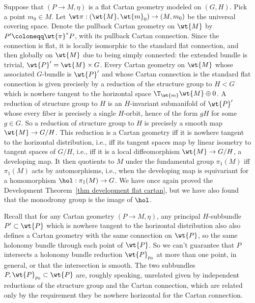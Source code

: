 \begin{example}
    Suppose that $(P\to M,\eta)$ is a flat Cartan geometry modeled on $(G,H)$. Pick a point $m_0\in M$. Let $\wt\pi:(\wt{M},\wt{m}_0)\to (M,m_0)$ be the universal covering space. Denote the pullback Cartan geometry on $\wt{M}$ by $P'\coloneqq \wt{\pi}^\ast P$, with its pullback Cartan connection. Since the connection is flat, it is locally isomorphic to the standard flat connection, and then globally on $\wt{M}$ due to being simply connected: the extended bundle is trivial, $\wt{P}'=\wt{M}\times G$. Every Cartan geometry on $\wt{M}$ whose associated $G$-bundle is $\wt{P}'$ and whose Cartan connection is the standard flat connection is given precisely by a reduction of the structure group to $H<G$ which is nowhere tangent to the horizontal space $\T_{\wt{m}}\wt{M}\oplus 0$. A reduction of structure group to $H$ is an $H$-invariant submanifold of $\wt{P}'$ whose every fiber is precisely a single $H$-orbit, hence of the form $gH$ for some $g\in G$. So a reduction of structure group to $H$ is precisely a smooth map $\wt{M}\to G\slash H$. This reduction is a Cartan geometry iff it is nowhere tangent to the horizontal distribution, i.e., iff its tangent spaces map by linear isometry to tangent spaces of $G\slash H$, i.e., iff it is a local diffeomorphism $\wt{M}\to G\slash H$, a developing map. It then quotients to $M$ under the fundamental group $\pi_1(M)$ iff $\pi_1(M)$ acts by automorphisms, i.e., when the developing map is equivariant for a homomorphism $\hol:\pi_1(M)\to G$. We have once again proved the Development Theorem~\ref{thm development flat cartan}, but we have also found that the monodromy group is the image of $\hol$.
\end{example}

\begin{rem}
    Recall that for any Cartan geometry $(P\to M,\eta)$, any principal $H$-subbundle $P'\subset \wt{P}$ which is nowhere tangent to the horizontal distribution also also defines a Cartan geometry with the same connection on $\wt{P}$, so the same holonomy bundle through each point of $\wt{P}$. So we can't guarantee that $P$ intersects a holonomy bundle reduction $\wt{P}_{p_0}$ at more than one point, in general, or that the intersection is smooth. The two subbundles $P,\wt{P}_{p_0}\subset \wt{P}$ are, roughly speaking, unrelated given by independent reductions of the structure group and the Cartan connection, which are related only by the requirement they be nowhere horizontal for the Cartan connection.
\end{rem}

